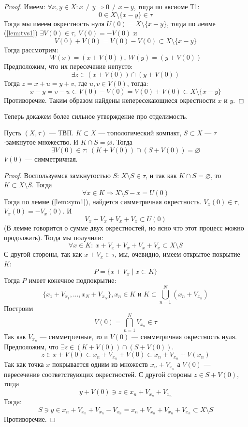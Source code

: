 \begin{proof}
	Имеем: $\forall x,y \in X: x \neq y \Rightarrow 0 \neq x - y$, тогда по аксиоме Т1: 
	$$
	0 \in X \setminus \{x - y\} \in \tau
	$$
	Тогда мы имеем окрестность нуля $U(0) = X \setminus \{x - y\}$, тогда по лемме (\ref{lem:tvs1}) $\exists V(0) \in \tau, \ V(0) = -V(0)$ и 
	$$
	V(0) + V(0) = V(0) - V(0) \subset X \setminus \{x - y\}
	$$
	Тогда рассмотрим: 
	$$
	W(x) = (x + V(0)), \ W(y) = (y + V(0))
	$$
	Предположим, что их пересечение непусто: 
	$$
	\exists z \in (x + V(0)) \cap (y + V(0))
	$$
	Тогда $z = x + u = y + v$, где $u,v \in V(0)$, тогда:
	$$
	x - y = v - u \subset V(0) - V(0) = V(0) +  V(0) \subset X \setminus \{x - y\}
 	$$
 	Противоречие. Таким образом найдены непересекающиеся окрестности $x$ и $y$.
\end{proof}
Теперь докажем более сильное утверждение про отделимость.
\begin{claim}
	Пусть $(X, \tau)$ --- ТВП. $K \subset X$ --- топологический компакт, $S \subset X$ --- $\tau$-замкнутое множество. И $K \cap S = \varnothing$. Тогда 
	$$
	\exists V(0)  \in \tau: \ (K + V(0))\cap (S + V(0)) = \varnothing
	$$
	$V(0)$ --- симметричная.
\end{claim}
\begin{proof}
	Воспользуемся замкнутостью $S$: $X \setminus S \in \tau$, и так как $K \cap S = \varnothing$, то $K \subset X \setminus S$. Тогда 
	$$
	\forall x \in K \Rightarrow X\setminus S - x  = U(0)
	$$
	Тогда по лемме (\ref{lem:sym1}), найдется симметричная окрестность. $V_x(0) \in \tau$, $V_x(0) = - V_x(0)$. И 
	$$
	V_x + V_x + V_x + V_x \subset U(0)
	$$
	(В лемме говорится о сумме двух окрестностей, но ясно что этот процесс можно продолжать). Тогда мы получили:
	$$
	\forall x \in K : \ x + V_x + V_x + V_x + V_x \subset X\setminus S
	$$
	С другой стороны, так как $x + V_x \in \tau$, мы, очевидно, имеем открытое покрытие $K$:
	$$
	P = \{x + V_x \mid x \subset K\}
	$$
	Тогда $P$ имеет конечное подпокрытие: 
	$$
	\{x_1 + V_{x_1}, \dots, x_N + V_{x_N}\}, x_n \in K \text{ и } K \subset \bigcup_{n=1}^N(x_n + V_{x_n})
	$$
	Построим 
	$$
	V(0) = \bigcap_{n=1}^N V_{x_n} \in \tau
	$$
	Так как $V_{x_n}$ --- симметричные, то и $V(0)$ --- симметричная окрестность нуля.
	Предположим, что $\exists z \in (K + V(0)) \cap (S + V(0))$. 
	$$
	z \in x + V(0) \subset x_n + V_{x_n} + V(0) \subset x_n + V_{x_n} + V(x_n)
	$$
	Так как точка $x$ покрывается одним из множеств $x_n + V_{x_n}$ а $V(0)$ --- пересечение соответствующих окрестностей. С другой стороны $z \in S + V(0)$, тогда
	$$
	y + V(0) \ni z \in x_n +V_{x_n} + V_{x_n}
	$$
	Тогда: 
	$$
	S \ni y \in x_n + V_{x_n} + V_{x_n} - V_{x_n} = x_n + V_{x_n} + V_{x_n} + V_{x_n} \subset X \setminus S
	$$
	Противоречие. 
\end{proof}
